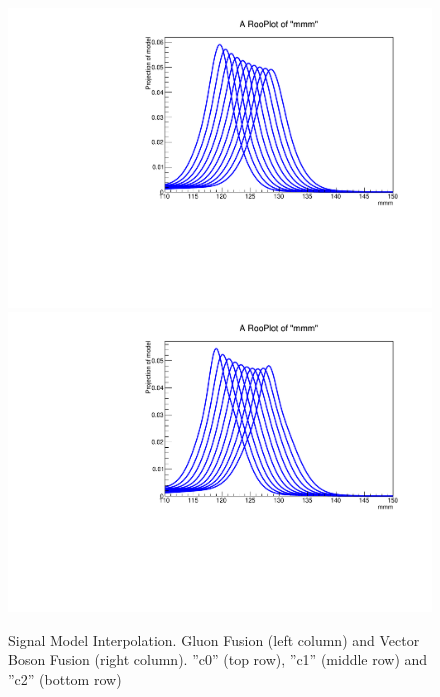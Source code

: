 \begin{figure}[hbp]
  \includegraphics[width=0.49\linewidth]{figures/signal_model/AppendixBdt/interpolation_GluGlu_cat2.pdf}
  \includegraphics[width=0.49\linewidth]{figures/signal_model/AppendixBdt/interpolation_VBF_cat2.pdf}
  \caption{Signal Model Interpolation. Gluon Fusion (left column) and Vector Boson Fusion (right column). ''c0'' (top row), ''c1'' (middle row) and ''c2'' (bottom row)}
  \label{fig:higgs_signalmodel_gluvbfc0c2}
\end{figure}
